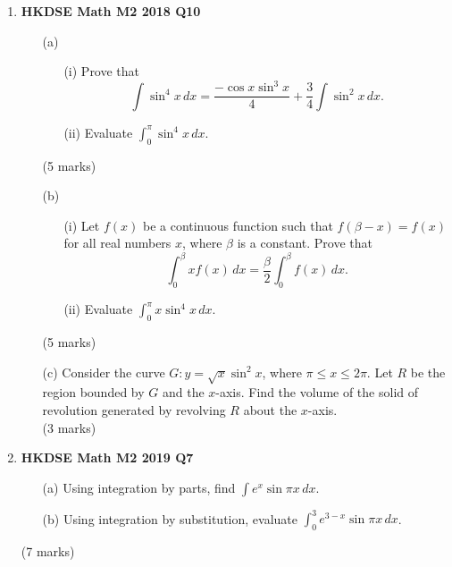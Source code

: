 \documentclass{report}
\begin{document}
\begin{enumerate}
	\item \textbf{HKDSE Math M2 2018 Q10}
	\begin{enumerate}
		\item [(a)] 
		\begin{enumerate}
			\item [(i)]Prove that $$\displaystyle \int \sin^4{x}\,dx = \frac{-\cos{x}\sin^3{x}}{4} + \frac{3}{4} \int \sin^2{x} \,dx.$$ 
			\item [(ii)] Evaluate $\displaystyle \int_{0}^{\pi} \sin^4{x}\,dx$.
		\end{enumerate}
		(5 marks)
		\item [(b)] 
		\begin{enumerate}
			\item [(i)]Let $f(x)$ be a continuous function such that $f(\beta - x)= f(x)$ for all real numbers $x$, where $\beta$ is a constant. Prove that $$\displaystyle\int_{0}^{\beta} x f(x) \,dx = \frac{\beta}{2} \int_{0}^{\beta } f(x) \,dx.$$
			\item [(ii)] Evaluate $\displaystyle \int_{0}^{\pi} x\sin^4{x}\,dx$.
		\end{enumerate}
		(5 marks)
	\item [(c)]Consider the curve $G : y = \displaystyle \sqrt{x}\sin^2{x}$, where $\pi \leq x \leq 2\pi $.
	Let $R$ be the region bounded by $G$ and the $x$-axis.
	Find the volume of the solid of revolution generated by revolving $R$ about the $x$-axis. \\(3 marks) 
	\end{enumerate}

	\item \textbf{HKDSE Math M2 2019 Q7}
	\begin{enumerate}
		\item [(a)]Using integration by parts, find $\displaystyle\int e^x\sin{\pi x}\, dx$. 
		\item [(b)]Using integration by substitution, evaluate $\displaystyle\int_{0}^{3} e^{3-x}\sin{\pi x} \,dx$.
	\end{enumerate}
	(7 marks)
	
	\newpage


\end{enumerate}
\end{document}
